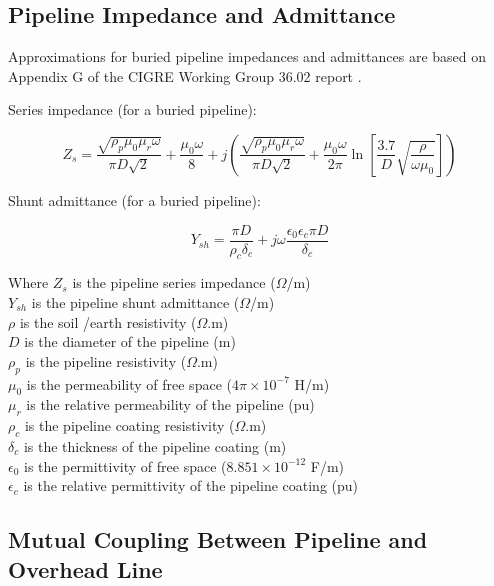 \documentclass{article}
\begin{document}
\subsection{Pipeline Impedance and Admittance}
\label{sec:pipeline_impedance}
Approximations for buried pipeline impedances and admittances are based on Appendix G of the CIGRE Working Group 36.02 report \cite{cigre_1995}.

Series impedance (for a buried pipeline):

\begin{equation}
Z_{s} = \frac{\sqrt{\rho_{p} \mu_{0} \mu_{r} \omega}}{\pi D \sqrt{2}} + \frac{\mu_{0} \omega}{8} + j \left(   \frac{\sqrt{\rho_{p} \mu_{0} \mu_{r} \omega}}{\pi D \sqrt{2}} + \frac{\mu_{0} \omega}{2 \pi} \ln{\left[ \frac{3.7}{D} \sqrt{\frac{\rho}{\omega \mu_{0}}} \right]} \right)
\end{equation}

Shunt admittance (for a buried pipeline):

\begin{equation}
Y_{sh} = \frac{\pi D}{\rho_{c} \delta_{c}} + j \omega \frac{\epsilon_{0} \epsilon_{c} \pi D}{\delta_{c}}
\end{equation}

Where $Z_{s}$ is the pipeline series impedance ($\Omega$/m) \\
\hphantom{Where} $Y_{sh}$ is the pipeline shunt admittance ($\Omega$/m) \\
\hphantom{Where} $\rho$ is the soil /earth resistivity ($\Omega$.m) \\
\hphantom{Where} $D$ is the diameter of the pipeline (m) \\
\hphantom{Where} $\rho_{p}$ is the pipeline resistivity ($\Omega$.m) \\
\hphantom{Where} $\mu_{0}$ is the permeability of free space ($4\pi \times 10^{-7}$ H/m) \\
\hphantom{Where} $\mu_{r}$ is the relative permeability of the pipeline (pu) \\
\hphantom{Where} $\rho_{c}$ is the pipeline coating resistivity ($\Omega$.m) \\
\hphantom{Where} $\delta_{c}$ is the thickness of the pipeline coating (m) \\
\hphantom{Where} $\epsilon_{0}$ is the permittivity of free space ($8.851 \times 10^{-12}$ F/m) \\
\hphantom{Where} $\epsilon_{c}$ is the relative permittivity of the pipeline coating (pu)

\subsection{Mutual Coupling Between Pipeline and Overhead Line}
\end{document}
